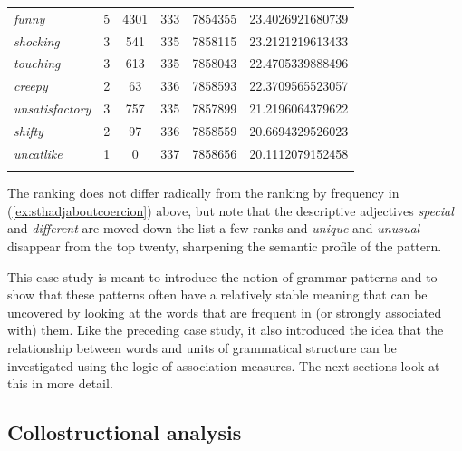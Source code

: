 \begin{table}
{\begin{tabular}[t]{l *{4}{S[table-format=5]} S}
\textit{funny} & 5 & 4301 & 333 & 7854355 & 23.4026921680739 \\
\textit{shocking} & 3 & 541 & 335 & 7858115 & 23.2121219613433 \\
\textit{touching} & 3 & 613 & 335 & 7858043 & 22.4705339888496 \\
\textit{creepy} & 2 & 63 & 336 & 7858593 & 22.3709565523057 \\
\textit{unsatisfactory} & 3 & 757 & 335 & 7857899 & 21.2196064379622 \\
\textit{shifty} & 2 & 97 & 336 & 7858559 & 20.6694329526023 \\
\textit{uncatlike} & 1 & 0 & 337 & 7858656 & 20.1112079152458 \\
\lspbottomrule
{} \\ %
\end{tabular}}
\end{table}

The ranking does not differ radically from the ranking by frequency  in (\ref{ex:sthadjaboutcoercion}) above, but note that the descriptive adjectives  \textit{special} and \textit{different} are moved down the list a few ranks and \textit{unique} and \textit{unusual} disappear from the top twenty, sharpening the semantic  profile of the pattern.

This case study is meant to introduce the notion of grammar patterns  and to show that these patterns often have a relatively stable meaning that can be uncovered by looking at the words that are frequent in (or strongly associated  with) them. Like the preceding case study, it also introduced the idea that the relationship between words and units of grammatical  structure can be investigated using the logic of association  measures.  The next sections look at this in more detail.

\subsection{Collostructional analysis}
\label{sec:collostructionalanalysis}

